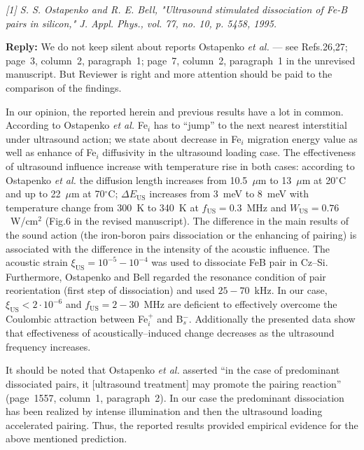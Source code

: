 \documentclass[aip,jap,preprint]{revtex4-1}
\begin{document}
\emph{
[1] S. S. Ostapenko and R. E. Bell, "Ultrasound stimulated dissociation of Fe-B pairs in silicon," J. Appl. Phys., vol. 77, no. 10, p. 5458, 1995.
 }

\noindent
\textcolor[rgb]{0.51,0.00,0.00}{\textbf{Reply:}}
We do not keep silent about reports Ostapenko \emph{et al.} --- see Refs.26,27;
page~3, column~2, paragraph~1; page~7, column~2, paragraph~1 in the unrevised manuscript.
But Reviewer is right and more attention should be paid to the comparison of the findings.

In our opinion,
the reported herein and previous results have a lot in common.
According to Ostapenko \emph{et al.}\cite{Ostapenko1995SST}
Fe$_i$ has to ``jump'' to the next nearest interstitial under ultrasound action;
we state about decrease in Fe$_i$ migration energy value
as well as enhance of Fe$_i$ diffusivity
in the ultrasound loading case.
The effectiveness of ultrasound influence increase with temperature rise in both cases:
according to Ostapenko \emph{et al.}\cite{Ostapenko1994APL,Ostapenko1995SST}
the diffusion length increases from 10.5~$\mu$m to 13~$\mu$m at 20$^\circ$C and up to
22~$\mu$m at 70$^\circ$C;
$\Delta E_\mathrm{US}$ increases from 3~meV to 8~meV with temperature change
from 300~K to 340~K at  $f_\mathrm{US}=0.3$~MHz and $W_\mathrm{US}=0.76$~W/cm$^2$
(Fig.6 in the revised manuscript).
The difference in the main results of the sound action
(the iron-boron pairs dissociation or the enhancing of pairing)
is associated with the difference in the intensity of the acoustic influence.
The acoustic strain $\xi_\mathrm{US}=10^{-5}-10^{-4}$ was used\cite{Ostapenko1995} to
dissociate FeB pair in Cz--Si.
Furthermore,
Ostapenko and Bell\cite{Ostapenko1995} regarded the resonance condition of
pair reorientation (first step of dissociation) and used $25-70$~kHz.
In our case,  $\xi_\mathrm{US}<2\cdot10^{-6}$ and $f_\mathrm{US}=2-30$~MHz are deficient to effectively overcome the Coulombic attraction between Fe$_i^+$ and B$_s^-$.
Additionally the presented data show that effectiveness of acoustically--induced change
decreases as the ultrasound frequency increases.

It should be noted that Ostapenko \emph{et al.}\cite{Ostapenko1994APL} asserted
``in the  case  of predominant  dissociated  pairs,  it [ultrasound treatment] may promote  the
pairing reaction'' (page~1557, column~1, paragraph~2).
In our case the predominant  dissociation has been realized by intense illumination and then
the ultrasound loading accelerated pairing.
Thus, the reported results provided empirical evidence  for the above mentioned prediction.
\end{document}
